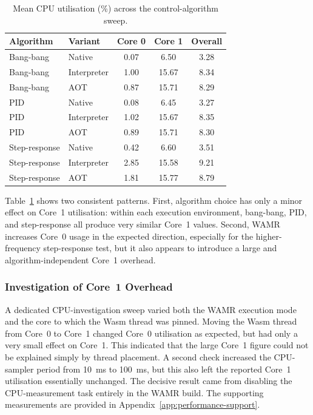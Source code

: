 \documentclass[12pt, a4paper]{report}
\begin{document}
\begin{table}[htbp]
\centering
\caption{Mean CPU utilisation (\%) across the control-algorithm sweep.}
\label{tab:cpu-utilisation-summary}
\small
\begin{tabular}{@{}llccc@{}}
\toprule
\textbf{Algorithm} & \textbf{Variant} & \textbf{Core 0} & \textbf{Core 1} & \textbf{Overall} \\
\midrule
Bang-bang & Native      & 0.07 & 6.50 & 3.28 \\
Bang-bang & Interpreter & 1.00 & 15.67 & 8.34 \\
Bang-bang & AOT         & 0.87 & 15.71 & 8.29 \\
\midrule
PID       & Native      & 0.08 & 6.45 & 3.27 \\
PID       & Interpreter & 1.02 & 15.67 & 8.35 \\
PID       & AOT         & 0.89 & 15.71 & 8.30 \\
\midrule
Step-response & Native      & 0.42 & 6.60 & 3.51 \\
Step-response & Interpreter & 2.85 & 15.58 & 9.21 \\
Step-response & AOT         & 1.81 & 15.77 & 8.79 \\
\bottomrule
\end{tabular}
\end{table}

Table~\ref{tab:cpu-utilisation-summary} shows two consistent patterns. First, algorithm choice has
only a minor effect on Core~1 utilisation: within each execution environment, bang-bang, PID, and
step-response all produce very similar Core~1 values. Second, WAMR increases Core~0 usage in the
expected direction, especially for the higher-frequency step-response test, but it also appears to
introduce a large and algorithm-independent Core~1 overhead. 

\subsubsection{Investigation of Core~1 Overhead}
A dedicated CPU-investigation sweep varied both the WAMR execution mode and the core to which the Wasm thread
was pinned. Moving the Wasm thread from Core~0 to Core~1 changed Core~0 utilisation as expected,
but had only a very small effect on Core~1. This indicated that the large Core~1 figure could not
be explained simply by thread placement. A second check increased the CPU-sampler period from
10~ms to 100~ms, but this also left the reported Core~1 utilisation essentially unchanged. The
decisive result came from disabling the CPU-measurement task entirely in the WAMR build. The supporting measurements are provided in Appendix~\ref{app:performance-support}.
\end{document}
